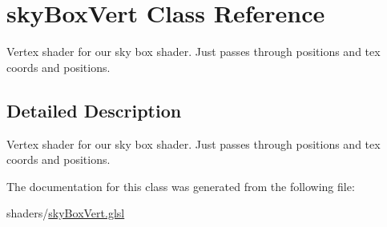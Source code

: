 \hypertarget{classsky_box_vert}{\section{sky\-Box\-Vert Class Reference}
\label{classsky_box_vert}
}


Vertex shader for our sky box shader. Just passes through positions and tex coords and positions.  




\subsection{Detailed Description}
Vertex shader for our sky box shader. Just passes through positions and tex coords and positions. 

The documentation for this class was generated from the following file\-:\begin{DoxyCompactItemize}
\item 
shaders/\hyperlink{sky_box_vert_8glsl}{sky\-Box\-Vert.\-glsl}\end{DoxyCompactItemize}
